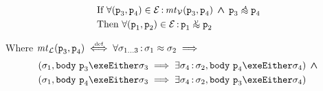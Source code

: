 \documentclass[runningheads,a4paper]{llncs}
\DeclareMathOperator{\band}{\bm{\;\land\;}}
\DeclareMathOperator{\suchthat}{:}
\newcommand*{\qvars}[2]{#1_{#2}}
\newcommand*{\defiff}{\stackrel{\text{\tiny def}}{\iff}}
\newcommand*{\sima}[1]{%
  \mathrel{\vcenter{\offinterlineskip
  \hbox{$\scriptscriptstyle\,\mathcal{#1}$}\vskip-.00ex\hbox{$\sim$}\vskip-.35ex\hbox{$\sim$}}}}
\newcommand*\iso{\approx}
\newcommand*\isoa{\sima{A}}
\newcommand*\isov{\sima{V}}
\newcommand*{\equivmap}{\mathcal{E}}
\newcommand*{\muttermname}{\mathit{mt}}
\newcommand*{\mutterm}[3]{{\muttermname}_{#1}(#2,#3)}
\newcommand*\Lsemantics{\mathcal{L}}
\newcommand*\Vsemantics{\mathcal{V}}
\newcommand*{\body}{\mathtt{body}}
\newcommand*{\fun}{\texttt{p}}
\newcommand*{\store}{\sigma}
\begin{document}
\begin{theorem}\label{lem:tool is sound}\setlength{\parindent}{0cm}

\[\begin{aligned}
&\text{If }\forall (\fun_3,\fun_4) \in \equivmap \suchthat \mutterm{\Vsemantics}{\fun_3}{\fun_4} \band \fun_3 \isoa \fun_4 \\
&\text{Then }\forall (\fun_1,\fun_2) \in \equivmap \suchthat \fun_1 \isov \fun_2
\end{aligned}\]

Where $\mutterm{\Lsemantics}{\fun_3}{\fun_4} \defiff \forall \qvars{\store}{1 \ldots 3} \suchthat \store_1 \iso \store_2 \implies$
\[\begin{aligned}
&	\left(\store_1,\body~\fun_3\exeEither\store_3 \implies \exists \store_4 \suchthat \store_2,\body~\fun_4\exeEither\store_4\right) \band \\
&	\left(\store_1,\body~\fun_4\exeEither\store_3 \implies \exists \store_4 \suchthat \store_2,\body~\fun_3\exeEither\store_4\right)
\end{aligned}\]
\end{theorem}
\def\tagone{(1)}
\def\tagtwo{(2)}
\def\tagthree{(3)}
\def\tagfour{(4)}
\def\tagfive{(5)}
\def\tagsix{(6)}
\def\sublemmaone{(l1)}
\end{document}
